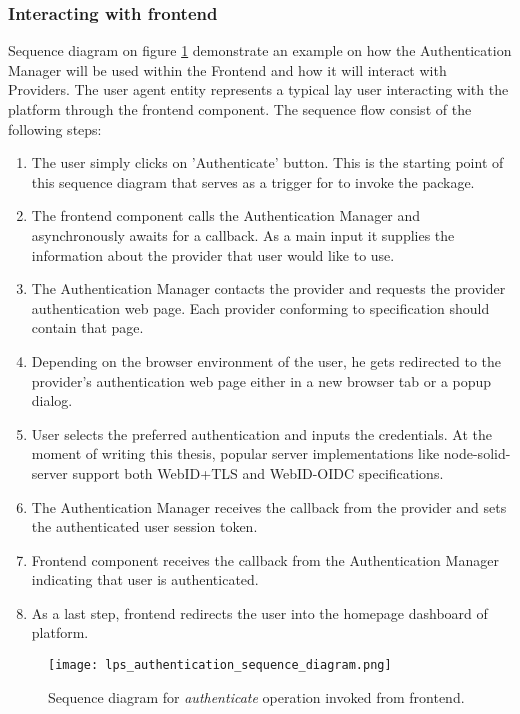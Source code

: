 \subsubsection{Interacting with frontend}

Sequence diagram on figure \ref{fig:lps_authentication_sequence_diagram} demonstrate an example on how the Authentication Manager will be used within the \lpa{} Frontend and how it will interact with \solid{} Providers. The user agent entity represents a typical lay \lpa{} user interacting with the platform through the frontend component. The sequence flow consist of the following steps:

\begin{enumerate}
    \item The user simply clicks on 'Authenticate' button. This is the starting point of this sequence diagram that serves as a trigger for \lpa{} to invoke the \lpa{} package.
    \item The frontend component calls the Authentication Manager and asynchronously awaits for a callback. As a main input it supplies the information about the \solid{} provider that user would like to use.
    \item The Authentication Manager contacts the \solid{} provider and requests the provider authentication web page. Each provider conforming to \solid{} specification should contain that page.
    \item Depending on the browser environment of the user, he gets redirected to the provider's authentication web page either in a new browser tab or a popup dialog.
    \item User selects the preferred authentication and inputs the credentials. At the moment of writing this thesis, popular \solid{} server implementations like node-solid-server support both WebID+TLS and WebID-OIDC specifications.
    \item The Authentication Manager receives the callback from the provider and sets the authenticated user session token.
    \item Frontend component receives the callback from the Authentication Manager indicating that user is authenticated.
    \item As a last step, frontend redirects the user into the homepage dashboard of \lpa{} platform.
\end{enumerate}


\begin{figure}[h]
\centering
\texttt{[image: lps\_authentication\_sequence\_diagram.png]}
\caption{Sequence diagram for \textit{authenticate} operation invoked from \lpa{} frontend.}
\label{fig:lps_authentication_sequence_diagram}
\end{figure}

